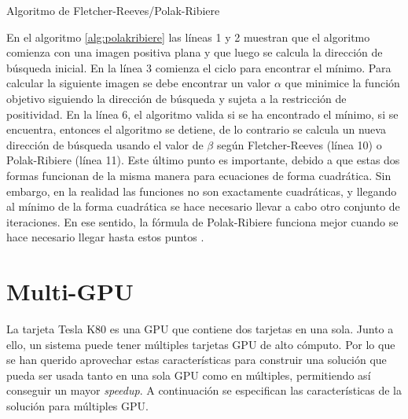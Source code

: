 \begin{algorithm}
	\begin{algorithmic}[1]
		\ELSE
		 
		 
		\ENDIF
		\ENDFOR
	\end{algorithmic}
	\caption{Algoritmo de Fletcher-Reeves/Polak-Ribiere}
	\label{alg:polakribiere}
\end{algorithm}

En el algoritmo \ref{alg:polakribiere} las líneas 1 y 2 muestran que el algoritmo comienza con una imagen positiva plana y que luego se calcula la dirección de búsqueda inicial. En la línea 3 comienza el ciclo para encontrar el mínimo. Para calcular la siguiente imagen se debe encontrar un valor $\alpha$ que minimice la función objetivo siguiendo la dirección de búsqueda y sujeta a la restricción de positividad. En la línea 6, el algoritmo valida si se ha encontrado el mínimo, si se encuentra, entonces el algoritmo se detiene, de lo contrario se calcula un nueva dirección de búsqueda usando el valor de $\beta$ según Fletcher-Reeves (línea 10) o Polak-Ribiere (línea 11). Este último punto es importante, debido a que estas dos formas funcionan de la misma manera para ecuaciones de forma cuadrática. Sin embargo, en la realidad las funciones no son exactamente cuadráticas, y llegando al mínimo de la forma cuadrática se hace necesario llevar a cabo otro conjunto de iteraciones. En ese sentido, la fórmula de Polak-Ribiere funciona mejor cuando se hace necesario llegar hasta estos puntos \citep{numericalrecipes}.



\chapter{Multi-GPU}
\label{cap:multigpu}
La tarjeta Tesla K80 es una GPU que contiene dos tarjetas en una sola. Junto a ello, un sistema puede tener múltiples tarjetas GPU de alto cómputo. Por lo que se han querido aprovechar estas características para construir una solución que pueda ser usada tanto en una sola GPU como en múltiples, permitiendo así conseguir un mayor \textit{speedup}. A continuación se especifican las características de la solución para múltiples GPU.



